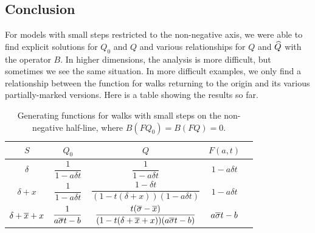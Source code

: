 \subsection{Conclusion}
For \oneD models with small steps restricted to the non-negative axis, we were able to find explicit solutions for $Q_0$ and $Q$ and various relationships for $Q$ and $\widehat Q$ with the operator $B$. In higher dimensions, the analysis is more difficult, but sometimes we see the same situation. In more difficult examples, we only find a relationship between the function for walks returning to the origin and its various partially-marked versions. Here is a table showing the results so far.
\begin{table}[H]
	\caption{Generating functions for walks with small steps on the non-negative half-line, where $B(FQ_0) = B(FQ) = 0$.}
	\label{tbl:table1d}
	\centering
	\begin{tabular}{ccccc}
		\toprule
		$S$ & $Q_0$ & $Q$ & $F(a,t)$\\
		\midrule
		$\delta$ & $\dfrac{1}{1- a \delta t}$ & $\dfrac{1}{1-a\delta t}$ & $1-a\delta t  $ \\
		$\delta  + x$ & $\dfrac{1}{1- a \delta t}$ & $\dfrac{1-\delta  t}{(1-t(\delta + x))(1-a\delta t )}$ & $1-a\delta t $ \\
		$\delta + \overline{x} + x$ & $\dfrac{1}{a\overline{\sigma} t - b}$ & $\dfrac{t(\overline{\sigma} -\overline{x})}{(1-t(\delta + \overline{x} + x))(a\overline{\sigma} t - b)}$ & $a\overline{\sigma} t-b$\\
		\bottomrule
	\end{tabular}
\end{table}

\endinput
